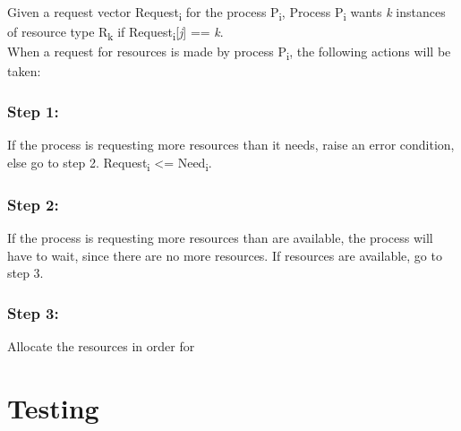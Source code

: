 Given a request vector Request\textsubscript{i} for the process P\textsubscript{i}, Process P\textsubscript{i} wants \textit{k} instances of resource type R\textsubscript{k} if Request\textsubscript{i}[\textit{j}] == \textit{k}.\\

When a request for resources is made by process P\textsubscript{i}, the following actions will be taken:

\subsubsection{Step 1:}
If the process is requesting more resources than it needs, raise an error condition, else go to step 2. Request\textsubscript{i} <= Need\textsubscript{i}.

\subsubsection{Step 2:}
If the process is requesting more resources than are available, the process will have to wait, since there are no more resources. If resources are available, go to step 3.

\subsubsection{Step 3:}
Allocate the resources in order for 

\section{Testing}